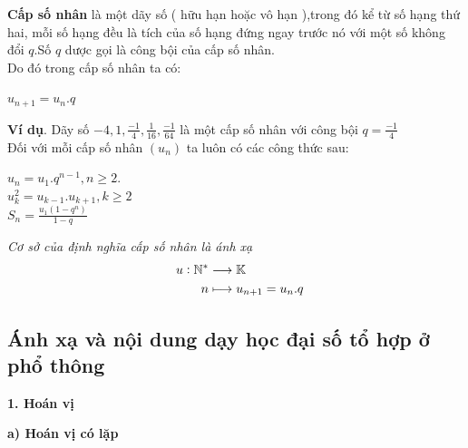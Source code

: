 \documentclass[12pt,oneside,a4paper,reqno]{book}
\begin{document}
\textbf{Cấp số nhân} là một dãy số ( hữu hạn hoặc vô hạn ),trong đó kể từ số hạng thứ hai, mỗi số hạng đều là tích của số hạng đứng ngay trước nó với một số không đổi $q$.Số $q$ dược gọi là công bội của cấp số nhân.\\
Do đó trong cấp số nhân ta có:\\
\begin{center}
$u_{n+1}=u_n.q$
\end{center}
{\bf Ví dụ}. Dãy số $-4, 1, \frac{-1}{4}, \frac{1}{16}, \frac{-1}{64}$ là một cấp số nhân với công bội $q=\frac{-1}{4}$\\
Đối với mỗi cấp số nhân $(u_n)$ ta luôn có các công thức sau:\\
\begin{center}
$u_n=u_1.q^{n-1} , n \ge 2$.\\
$u^{2}_{k}=u_{k-1}.u_{k+1} , k \ge 2$\\
$S_n=\frac{u_1(1-q^n)}{1-q}$
\end{center}
\textit{Cơ sở của định nghĩa cấp số nhân là ánh xạ}\\
\begin{align*}
\text{ \space}u:\mathbb{N^*}&\longrightarrow\mathbb{K}\\
n&\longmapsto u_{n+1}=u_n.q 
\end{align*}




\subsection{Ánh xạ và nội dung dạy học đại số tổ hợp ở phổ thông}
\textbf{1. Hoán vị}

{\bf a) Hoán vị có lặp}
\end{document}
